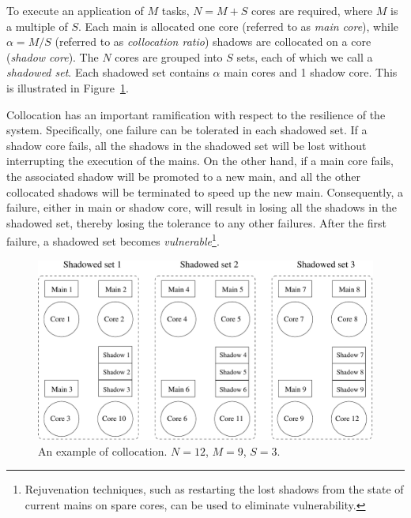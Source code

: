 To execute an application of $M$ tasks, $N=M+S$ cores are required, where $M$ is a multiple of $S$. Each main is allocated one core (referred to as \textit{main core}), while $\alpha=M/S$ (referred to as \textit{collocation ratio}) shadows are collocated on a core (\textit{shadow core}). 
The $N$ cores are grouped into $S$ sets, each of which we call a \textit{shadowed set}. Each shadowed set contains $\alpha$ main cores and 1 shadow core.
This is illustrated in Figure~\ref{fig:sc_mapping}.  

Collocation has an important ramification with respect to the resilience of the system. Specifically, 
one failure can be tolerated in each shadowed set. If a shadow core fails, all the shadows in the 
shadowed set will be lost without interrupting the execution of the mains. 
On the other hand, if a main core fails, the associated shadow will be promoted to a new main, and all 
the other collocated shadows will be terminated to speed up the new main.
Consequently, a failure, either in main or shadow core, will result in losing all the shadows in the shadowed set, thereby losing the tolerance to any other failures. After the first failure, a shadowed set becomes \emph{vulnerable}\footnote{Rejuvenation techniques, such as restarting the lost shadows from the state of current mains on spare cores, can be used to eliminate vulnerability.}. 
 
\begin{figure}[!b]
  \begin{center}
    \includegraphics[width=0.6\columnwidth]{figures/sc_mapping.pdf}
  \end{center}
  \caption{An example of collocation. $N=12$, $M=9$, $S=3$.}
  \label{fig:sc_mapping}
\end{figure}


